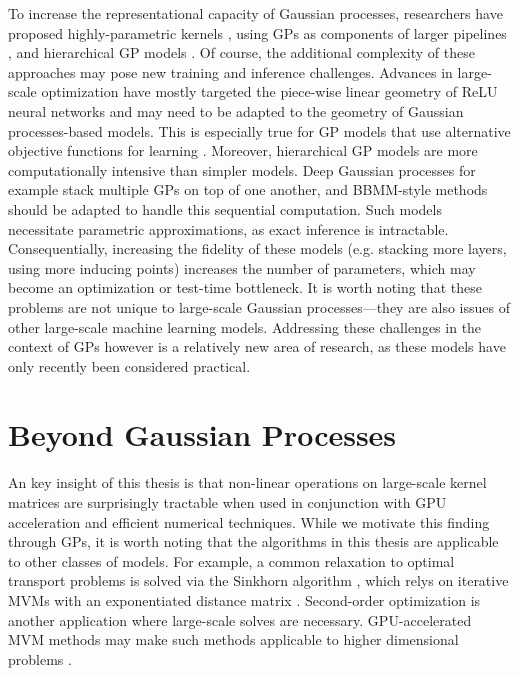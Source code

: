 To increase the representational capacity of Gaussian processes, researchers have proposed highly-parametric kernels \cite{wilson2013gaussian,wilson2016stochastic}, using GPs as components of larger pipelines \cite{schulam2015framework,futoma2017learning}, and hierarchical GP models \cite{wilson2012gaussian,salimbeni2017doubly,jankowiak2020deep}.
Of course, the additional complexity of these approaches may pose new training and inference challenges.
Advances in large-scale optimization have mostly targeted the piece-wise linear geometry of ReLU neural networks and may need to be adapted to the geometry of Gaussian processes-based models.
This is especially true for GP models that use alternative objective functions for learning \cite{sheth2017excess,knoblauch2019generalized,jankowiak2020parametric}.
Moreover, hierarchical GP models are more computationally intensive than simpler models.
Deep Gaussian processes for example stack multiple GPs on top of one another, and BBMM-style methods should be adapted to handle this sequential computation.
Such models necessitate parametric approximations, as exact inference is intractable.
Consequentially, increasing the fidelity of these models (e.g. stacking more layers, using more inducing points) increases the number of parameters, which may become an optimization or test-time bottleneck.
It is worth noting that these problems are not unique to large-scale Gaussian processes---they are also issues of other large-scale machine learning models.
Addressing these challenges in the context of GPs however is a relatively new area of research, as these models have only recently been considered practical.




\section{Beyond Gaussian Processes}

An key insight of this thesis is that non-linear operations on large-scale kernel matrices are surprisingly tractable when used in conjunction with GPU acceleration and efficient numerical techniques.
While we motivate this finding through GPs, it is worth noting that the algorithms in this thesis are applicable to other classes of models.
For example, a common relaxation to optimal transport problems is solved via the Sinkhorn algorithm \cite{cuturi2013sinkhorn}, which relys on iterative MVMs with an exponentiated distance matrix \cite{altschuler2019massively}.
Second-order optimization is another application where large-scale solves are necessary.
GPU-accelerated MVM methods may make such methods applicable to higher dimensional problems \cite{koh2017understanding}.

